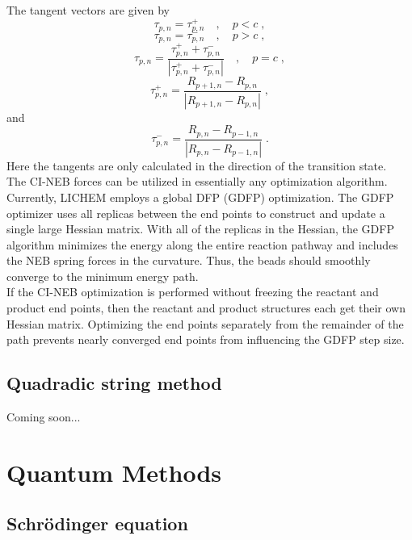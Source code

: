 \documentclass[12pt]{report}
\begin{document}
The tangent vectors are given by \cite{}
\begin{equation}
 \tau_{p,n} = \tau_{p,n}^{+}
 \quad , \quad
 p < c \; ,
\end{equation}
\begin{equation}
 \tau_{p,n} = \tau_{p,n}^{-}
 \quad , \quad
 p > c \; ,
\end{equation}
\begin{equation}
 \tau_{p,n} = \frac{\tau_{p,n}^{+}+\tau_{p,n}^{-}}
 {|\tau_{p,n}^{+}+\tau_{p,n}^{-}|}
 \quad , \quad
 p = c \; ,
\end{equation}
\begin{equation}
 \tau_{p,n}^{+} = \frac{R_{p+1,n}-R_{p,n}}{|R_{p+1,n}-R_{p,n}|} \; ,
\end{equation}
and
\begin{equation}
 \tau_{p,n}^{-} = \frac{R_{p,n}-R_{p-1,n}}{|R_{p,n}-R_{p-1,n}|} \; .
\end{equation}
Here the tangents are only calculated in the direction of the transition
state. \\

The CI-NEB forces can be utilized in essentially any optimization algorithm.
Currently, LICHEM employs a global DFP (GDFP) optimization.
The GDFP optimizer uses all replicas between the end points to construct and
update a single large Hessian matrix.
With all of the replicas in the Hessian, the GDFP algorithm minimizes the
energy along the entire reaction pathway and includes the NEB spring forces
in the curvature.
Thus, the beads should smoothly converge to the minimum energy path. \\

If the CI-NEB optimization is performed without freezing the reactant and
product end points, then the reactant and product structures each get their
own Hessian matrix.
Optimizing the end points separately from the remainder of the path prevents
nearly converged end points from influencing the GDFP step size.

\subsection{Quadradic string method}

{\color{red}Coming soon...}

\section{Quantum Methods}

\subsection{Schr\"{o}dinger equation}
\end{document}
